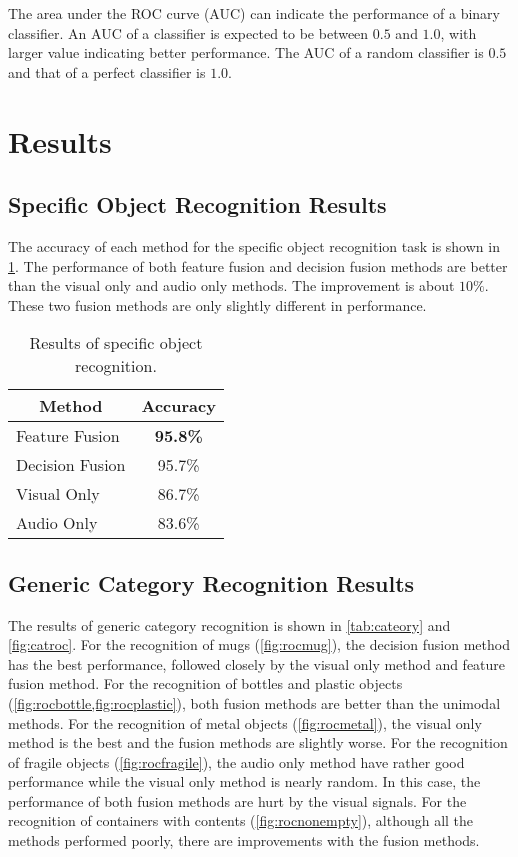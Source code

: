 \documentclass[12pt,final,twoside]{report}
\begin{document}
The area under the ROC curve (AUC) can indicate the performance of a binary classifier. An AUC of a classifier is expected to be between $0.5$ and $1.0$, with larger value indicating better performance. The AUC of a random classifier is $0.5$ and that of a perfect classifier is $1.0$.

\section{Results}
\subsection{Specific Object Recognition Results}
The accuracy of each method for the specific object recognition task is shown in \cref{tab:spec}. The performance of both feature fusion and decision fusion methods are better than the visual only and audio only methods. The improvement is about $10\%$. These two fusion methods are only slightly different in performance.

\begin{table}
  \caption{Results of specific object recognition.}
  \label{tab:spec}
  \centering
  \begin{tabular}[h!]{lc}
    \toprule
    \multicolumn{1}{c}{Method} & Accuracy \\ \midrule
    Feature Fusion & \textbf{95.8\%} \\
    Decision Fusion  & 95.7\% \\
    Visual Only & 86.7\% \\
    Audio Only & 83.6\% \\
    \bottomrule
  \end{tabular}
\end{table}

\subsection{Generic Category Recognition Results}
The results of generic category recognition is shown in \cref{tab:cateory} and \cref{fig:catroc}. For the recognition of mugs (\cref{fig:rocmug}), the decision fusion method has the best performance, followed closely by the visual only method and feature fusion method. For the recognition of bottles and plastic objects (\cref{fig:rocbottle,fig:rocplastic}), both fusion methods are better than the unimodal methods. For the recognition of metal objects (\cref{fig:rocmetal}), the visual only method is the best and the fusion methods are slightly worse. For the recognition of fragile objects (\cref{fig:rocfragile}), the audio only method have rather good performance while the visual only method is nearly random. In this case, the performance of both fusion methods are hurt by the visual signals. For the recognition of containers with contents (\cref{fig:rocnonempty}), although all the methods performed poorly, there are improvements with the fusion methods.
\end{document}
